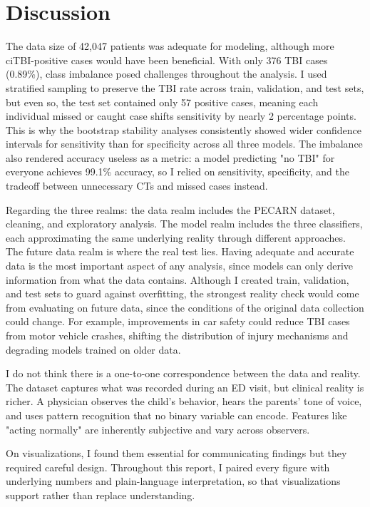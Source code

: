 \documentclass[11pt,letterpaper]{article}
\begin{document}
\section{Discussion}\label{discussion}

The data size of 42,047 patients was adequate for modeling, although more ciTBI-positive cases would have been beneficial. With only 376 TBI cases (0.89\%), class imbalance posed challenges throughout the analysis. I used stratified sampling to preserve the TBI rate across train, validation, and test sets, but even so, the test set contained only 57 positive cases, meaning each individual missed or caught case shifts sensitivity by nearly 2 percentage points. This is why the bootstrap stability analyses consistently showed wider confidence intervals for sensitivity than for specificity across all three models. The imbalance also rendered accuracy useless as a metric: a model predicting "no TBI" for everyone achieves 99.1\% accuracy, so I relied on sensitivity, specificity, and the tradeoff between unnecessary CTs and missed cases instead.

Regarding the three realms: the data realm includes the PECARN dataset, cleaning, and exploratory analysis. The model realm includes the three classifiers, each approximating the same underlying reality through different approaches. The future data realm is where the real test lies. Having adequate and accurate data is the most important aspect of any analysis, since models can only derive information from what the data contains. Although I created train, validation, and test sets to guard against overfitting, the strongest reality check would come from evaluating on future data, since the conditions of the original data collection could change. For example, improvements in car safety could reduce TBI cases from motor vehicle crashes, shifting the distribution of injury mechanisms and degrading models trained on older data.

I do not think there is a one-to-one correspondence between the data and reality. The dataset captures what was recorded during an ED visit, but clinical reality is richer. A physician observes the child's behavior, hears the parents' tone of voice, and uses pattern recognition that no binary variable can encode. Features like "acting normally" are inherently subjective and vary across observers.

On visualizations, I found them essential for communicating findings but they required careful design. Throughout this report, I paired every figure with underlying numbers and plain-language interpretation, so that visualizations support rather than replace understanding.
\end{document}
